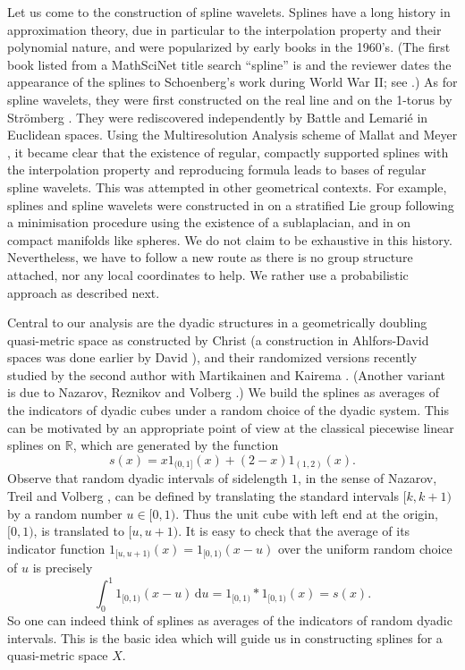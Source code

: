 \documentclass{amsart}
\numberwithin{equation}{section}
\theoremstyle{plain}
\theoremstyle{definition}
\theoremstyle{remark}
\begin{document}
{{Let us come to the construction of spline wavelets.  Splines have a long history in approximation theory, due in particular to the interpolation property  and   their polynomial nature, and were popularized by early books in the 1960's. (The first book listed from a MathSciNet title search ``spline'' is \cite{ANW} and the reviewer dates the appearance of the splines  to Schoenberg's work  during World War II; see \cite{Sch}.)  As for spline wavelets, they were first constructed on the real line and on the 1-torus by Str\"omberg \cite{Str}. They were rediscovered  independently by Battle \cite{Bat} and Lemari\'e \cite{Lem1} in Euclidean spaces. Using the Multiresolution Analysis scheme of Mallat \cite{Mal} and Meyer \cite{Mey}, it became clear that the existence of regular, compactly supported splines with the interpolation property and reproducing formula  leads to bases of regular spline wavelets. This was attempted in other geometrical contexts. For example, splines  and spline wavelets were constructed in \cite{Lem2} on a stratified Lie group following a minimisation procedure using the existence of a sublaplacian, and in \cite{DDW} on compact manifolds like spheres. We do not claim to be exhaustive in this history. Nevertheless,  we have to  follow a new route as  there is no group structure attached, nor any local coordinates to help. We rather use a probabilistic approach as described next.

Central to our analysis are the dyadic structures in a geometrically doubling quasi-metric space  as  constructed by Christ \cite{Christ} (a construction in Ahlfors-David spaces was done earlier by David \cite{D}),  and their randomized versions recently studied by the second author with  Martikainen \cite{HM} and Kairema \cite{HK}. {(Another variant is due to Nazarov, Reznikov and Volberg \cite{NRV}.)} We build the splines as averages of the indicators of dyadic cubes under a random choice of the dyadic system. This can be motivated by an appropriate point of view at  the classical piecewise linear splines on ${\mathbb{R}}$, which are generated by the function
\begin{equation*}
  s(x)= x1_{(0,1]}(x)+(2-x)1_{(1,2)}(x).
\end{equation*}
Observe that random dyadic intervals of sidelength $1$, in the sense of Nazarov, Treil and Volberg {\cite[Sec.~9.1]{NTV}}, can be defined by translating the standard intervals $[k,k+1)$ by a random number $u\in[0,1)$. Thus the unit cube with left end at the origin, $[0,1)$, is translated to $[u,u+1)$. It is easy to check that the average of its indicator function $1_{[u,u+1)}(x)=1_{[0,1)}(x-u)$ over the uniform random choice of $u$ is precisely
\begin{equation*}
  \int_0^1 1_{[0,1)}(x-u){\,\mathrm{d}} u =1_{[0,1)}*1_{[0,1)}(x) = s(x).
\end{equation*}
So one can indeed think of splines as averages of the indicators of random dyadic intervals. This is the basic idea which will guide us in constructing splines for a quasi-metric space $X$. 

}}
\end{document}
